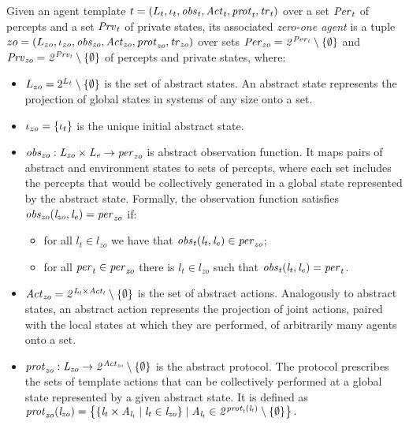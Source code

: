 \begin{definition}
Given an agent template ${t} = \left ( L_{t}, \iota_{t}, \it{obs}_{t},  \it{Act}_{t},
\it{prot}_{t}, \it{tr}_{t}  \right )$ over a set $\it{Per}_{t}$ of percepts and a set $\it{Prv}_{t}$ of
private states, its associated \emph{zero-one agent} is a tuple ${zo} =
\left ( L_{zo}, \iota_{zo}, \it{obs}_{zo}, \it{Act}_{zo}, \it{prot}_{zo}, \it{tr}_{zo} \right )$ over
sets $\it{Per}_{zo} = 2^{\it{Per}_{t}} \setminus \left \{ \emptyset \right \}$ and $\it{Prv}_{zo}=
2^{\it{Prv}_{t}} \setminus \left \{ \emptyset \right \}$ of percepts and private states, where:
\begin{itemize} 
    \item $L_{zo} = 2^{L_{t}} \setminus \left \{ \emptyset \right \}$ is the set
    of abstract states. An abstract state represents the projection of global
    states in systems of any size onto a set.

    \item $\iota_{zo} = \left \{ \iota_{t} \right \}$ is the unique initial abstract state.
    
    \item $\it{obs}_{zo} : L_{zo} \times L_{e} \rightarrow \it{per}_{zo}$ is
    abstract observation function. It maps pairs of abstract and environment
    states to sets of percepts, where each set includes the percepts that would
    be collectively generated in a global state represented by the abstract
    state. Formally, the observation function satisfies $\it{obs}_{zo}(l_{zo}, l_e) =
    \it{per}_{zo}$ if:
    \begin{itemize}
        \item for all $l_t \in l_{zo}$ we have that $\it{obs}_{t}(l_t, l_e) \in
        \it{per}_{zo}$;
        \item for all $\it{per}_{t} \in \it{per}_{zo}$ there is $l_t \in
        l_{zo}$ such that $\it{obs}_{t}(l_t, l_e) = \it{per}_{t}$.
    \end{itemize}

    \item $\it{Act}_{zo} = 2^{L_{t} \times \it{Act}_{t}} \setminus \left \{ \emptyset \right \}$
    is the set of abstract actions. Analogously to abstract states, an abstract
    action represents the projection of joint actions, paired with the local
    states at which they are performed,  of arbitrarily many agents onto a set.

    \item $\it{prot}_{zo} : L_{zo} \rightarrow 2^{\it{Act}_{zo}} \setminus
    \left \{ \emptyset \right \}$ is the abstract protocol. The protocol prescribes the sets
    of template actions that can be collectively performed at a global state
    represented by a given abstract state. It is defined as $\it{prot}_{zo}(l_{zo})
    = \left \{  \left \{ l_t \times A_{l_t} \mid l_t \in l_{zo} \right \} \mid A_{l_t} \in
    2^{\it{prot}_{t}(l_t)} \setminus \left \{ \emptyset \right \} \right \}.$


\end{itemize}
\end{definition}
